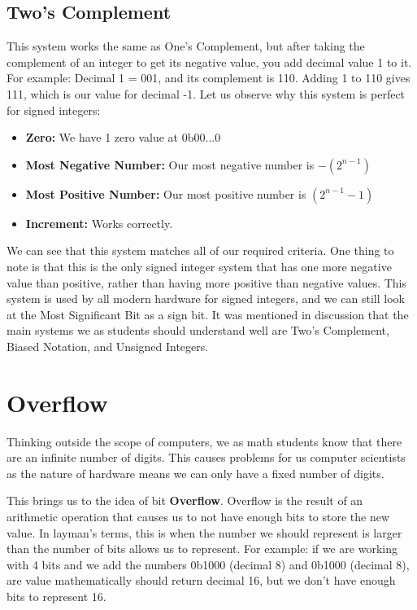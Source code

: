 \documentclass[letterpaper]{article}
\theoremstyle{remark}
\begin{document}
\subsection{Two's Complement}
This system works the same as One's Complement, but after taking the complement of an integer to get its negative value, you add decimal value 1 to it. For example: Decimal 1 = 001, and its complement is 110. Adding 1 to 110 gives 111, which is our value for decimal -1. Let us observe why this system is perfect for signed integers:
\begin{itemize}
    \item \textbf{Zero:} We have 1 zero value at 0b00...0
    \item \textbf{Most Negative Number:} Our most negative number is $-(2^{n-1})$
    \item \textbf{Most Positive Number:} Our most positive number is $(2^{n-1} - 1)$
    \item \textbf{Increment:} Works correctly.
\end{itemize}
We can see that this system matches all of our required criteria. One thing to note is that this is the only signed integer system that has one more negative value than positive, rather than having more positive than negative values. This system is used by all modern hardware for signed integers, and we can still look at the Most Significant Bit as a sign bit. It was mentioned in discussion that the main systems we as students should understand well are Two's Complement, Biased Notation, and Unsigned Integers.

\section{Overflow}
Thinking outside the scope of computers, we as math students know that there are an infinite number of digits. This causes problems for us computer scientists as the nature of hardware means we can only have a fixed number of digits.

This brings us to the idea of bit \textbf{Overflow}. Overflow is the result of an arithmetic operation that causes us to not have enough bits to store the new value. In layman's terms, this is when the number we should represent is larger than the number of bits allows us to represent. For example: if we are working with 4 bits and we add the numbers 0b1000 (decimal 8) and 0b1000 (decimal 8), are value mathematically should return decimal 16, but we don't have enough bits to represent 16.
\end{document}
